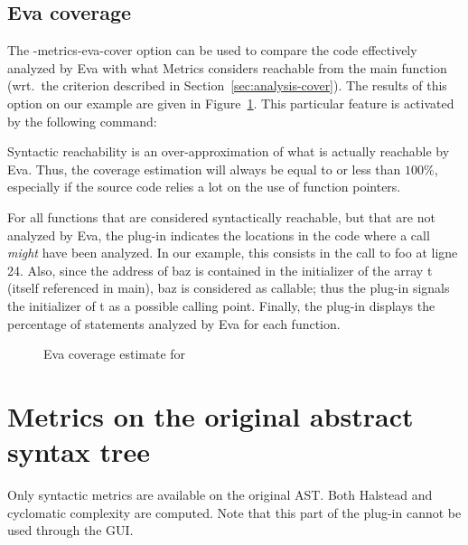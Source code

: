 \documentclass{frama-c-book}
\begin{document}
\subsection{Eva coverage}
\label{sec:eva-cover}

The {\sf -metrics-eva-cover} option can be used to compare the code
effectively analyzed by Eva with what {\sf Metrics}
considers reachable from the {\sf main} function (wrt.\ the criterion
described in Section~\ref{sec:analysis-cover}).  The results of this option on our
example are given in Figure~\ref{fig:value-cover}. This particular
feature is activated by the following command:

\begin{shell}[escapechar={\#}]
\end{shell}

Syntactic reachability is an over-approximation of what is actually
reachable by Eva. Thus, the coverage estimation will
always be equal to or less than $100\%$, especially if the source
code relies a lot on the use of function pointers.

For all functions that are considered syntactically reachable, but that
are not analyzed by Eva, the plug-in indicates the
locations in the code where a call \emph{might} have been analyzed.
In our example, this consists in the call to {\sf foo} at ligne 24.
Also, since the address of {\sf baz} is contained in
the initializer of the array {\sf t} (itself referenced in {\sf main}),
{\sf baz} is considered as callable; thus the plug-in signals the
initializer of {\sf t} as a possible calling point.
%
Finally, the plug-in displays the percentage of statements analyzed by Eva
for each function.

\begin{figure}[!ht]
  \centering
    
  \caption{Eva coverage estimate for \pgname}
  \label{fig:value-cover}
\end{figure}


\section{Metrics on the original abstract syntax tree}
\label{sec:metrics-original-ast}

Only syntactic metrics are available on the original AST. Both Halstead and
cyclomatic complexity are computed. Note that this part of the plug-in
cannot be used through the GUI.
\end{document}
